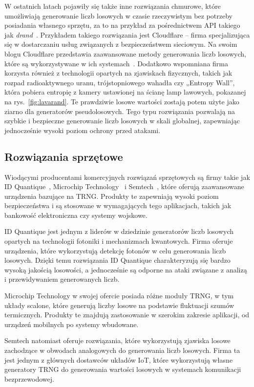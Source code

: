 W ostatnich latach pojawiły się także inne rozwiązania chmurowe, które umożliwiają generowanie liczb losowych w czasie rzeczywistym bez potrzeby posiadania własnego sprzętu,
za to na przykład za pośrednictwem API takiego jak \textit{drand}~\cite{drand_documentation}.
Przykładem takiego rozwiązania jest Cloudflare – firma specjalizująca się w dostarczaniu usług związanych z bezpieczeństwem sieciowym.
Na swoim blogu Cloudflare przedstawia zaawansowane metody generowania liczb losowych, które są wykorzystywane w ich systemach~\cite{cloudflare_league_of_entropy}.
Dodatkowo wspomniana firma korzysta również z technologii opartych na zjawiskach fizycznych, takich jak rozpad radioaktywnego uranu,
trójstopniowego wahadła czy „Entropy Wall”, która pobiera entropię z kamery
ustawionej na ścianę lamp lawowych, pokazanej na rys.~\ref{fig:lavarand}.
Te prawdziwie losowe wartości zostają potem użyte jako ziarno dla generatorów pseudolosowych.
Tego typu rozwiązania pozwalają na szybkie i bezpieczne generowanie liczb losowych w skali globalnej, zapewniając jednocześnie wysoki poziom ochrony przed atakami.

\subsection{Rozwiązania sprzętowe}\label{subsec:rozwiazania-sprzetowe}
Wiodącymi producentami komercyjnych rozwiązań sprzętowych są firmy takie jak
ID Quantique~\cite{IDQ}, Microchip Technology~\cite{MicrochipTechnology} i Semtech~\cite{Semtech},
które oferują zaawansowane urządzenia bazujące na TRNG.
Produkty te zapewniają wysoki poziom bezpieczeństwa i są stosowane w wymagających tego aplikacjach,
takich jak bankowość elektroniczna czy systemy wojskowe.

ID Quantique jest jednym z liderów w dziedzinie generatorów liczb losowych opartych na technologii fotoniki i mechanizmach kwantowych.
Firma oferuje urządzenia, które wykorzystują detekcję fotonów w celu generowania liczb losowych.
Dzięki temu rozwiązania ID Quantique charakteryzują się bardzo wysoką jakością losowości, a jednocześnie są odporne na ataki związane z analizą i przewidywaniem generowanych liczb.

Microchip Technology w swojej ofercie posiada różne moduły TRNG, w tym układy scalone,
które generują liczby losowe na podstawie fluktuacji szumów termicznych.
Produkty te znajdują zastosowanie w szerokim zakresie aplikacji, od urządzeń mobilnych po systemy wbudowane.

Semtech natomiast oferuje rozwiązania, które wykorzystują zjawiska losowe
zachodzące w obwodach analogowych do generowania liczb losowych.
Firma ta jest jednym z głównych dostawców układów IoT, które wykorzystują własne generatory TRNG
do generowania wartości losowych w systemach komunikacji bezprzewodowej.


